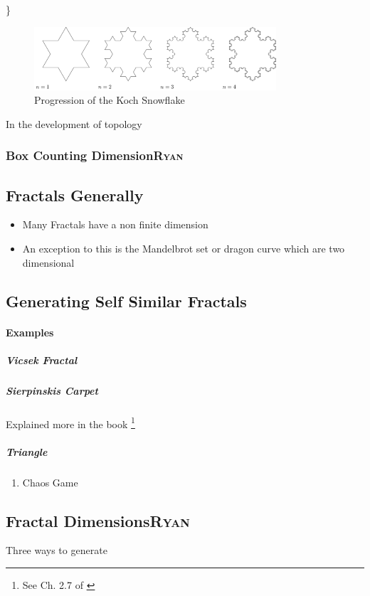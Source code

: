 \documentclass[11pt]{article}
\begin{document}
\}

\begin{figure}[htbp]
\centering
\includegraphics[width=9cm]{media/tikz/Snowflake.png}
\caption{\label{koch-snowflake}Progression of the Koch Snowflake}
\end{figure}






In the development of topology
\subsubsection{Box Counting Dimension\hfill{}\textsc{Ryan}}
\label{sec:orge79fca0}
\subsection{Fractals Generally}
\label{sec:org0a55e1e}
\begin{itemize}
\item Many Fractals have a non finite dimension
\item An exception to this is the Mandelbrot set or dragon curve which are two dimensional
\end{itemize}
\subsection{Generating Self Similar Fractals}
\label{sec:org014b534}
\paragraph{Examples}
\label{sec:orgfaf1fa7}
\subparagraph{Vicsek Fractal}
\label{sec:org78f60cf}
\subparagraph{Sierpinskis Carpet}
\label{sec:org90cfa1b}

Explained more in the book \footnote{See Ch. 2.7 of \cite[Ch. 2.7]{peitgenChaosFractalsNew2004}}
\subparagraph{Triangle}
\label{sec:org28fcf6e}
\begin{enumerate}
\item Chaos Game
\label{sec:org7bd2611}
\end{enumerate}
\subsection{Fractal Dimensions\hfill{}\textsc{Ryan}}
\label{sec:orgc0f30dc}
Three ways to generate
\end{document}
